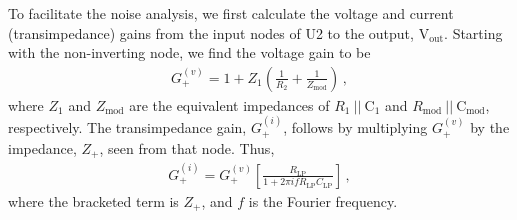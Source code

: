 \documentclass[aip,rsi,reprint]{revtex4-1} %
\begin{document}
To facilitate the noise analysis, we first calculate the voltage and current (transimpedance) gains from the input nodes of U2 to the output, $\text{V}_\text{out}$.
Starting with the non-inverting node, we find the voltage gain to be
\begin{align}
G_{+}^{(v)} = 1 + Z_1\left(\frac{1}{R_2} + \frac{1}{Z_\text{mod}}\right)\,,
\end{align}
where $Z_1$ and $Z_\text{mod}$ are the equivalent impedances of $R_1~||~\text{C}_1$ and $R_\text{mod}~||~\text{C}_\text{mod}$, respectively.
The transimpedance gain, $G^{(i)}_{+}$, follows by multiplying $G_+^{(v)}$ by the impedance, $Z_+$, seen from that node. %
Thus,
\begin{align}
G_{+}^{(i)} = G_{+}^{(v)}\left[\frac{R_\text{LP}}{1+2\pi i f R_\text{LP} C_\text{LP}}\right]\,,
\end{align}
where the bracketed term is $Z_+$, and $f$ is the Fourier frequency.
 
\end{document}

